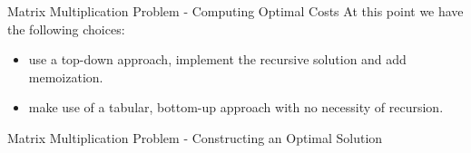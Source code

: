 \begin{frame}{Matrix Multiplication Problem - Computing Optimal Costs}
  At this point we have the following choices:
  \begin{itemize}
    \item use a top-down approach, implement the recursive solution and add memoization.
    \item make use of a tabular, bottom-up approach with no necessity of recursion.
  \end{itemize}
\end{frame}

\begin{frame}
  
\end{frame}

\begin{frame}{Matrix Multiplication Problem - Constructing an Optimal Solution}
  
\end{frame}
